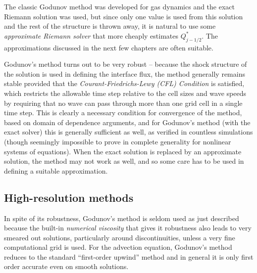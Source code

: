 \documentclass{SIAMbook2016}
\begin{document}
The classic Godunov method was developed for gas dynamics and the exact
Riemann solution was used, but since only one value is used from this
solution and the rest of the structure is thrown away, it is natural to
use some \emph{approximate Riemann solver} that more cheaply estimates
\(Q_{j-1/2}^*\). The approximations discussed in the next few chapters
are often suitable.

Godunov's method turns out to be very robust -- because the shock
structure of the solution is used in defining the interface flux, the
method generally remains stable provided that the
\emph{Courant-Friedrichs-Lewy (CFL) Condition} is satisfied, which
restricts the allowable time step relative to the cell sizes and wave
speeds by requiring that no wave can pass through more than one grid
cell in a single time step. This is clearly a necessary condition for
convergence of the method, based on domain of dependence arguments, and
for Godunov's method (with the exact solver) this is generally
sufficient as well, as verified in countless simulations (though
seemingly impossible to prove in complete generality for nonlinear
systems of equations). When the exact solution is replaced by an
approximate solution, the method may not work as well, and so some care
has to be used in defining a suitable approximation.

\hypertarget{high-resolution-methods}{%
\subsection{High-resolution methods}\label{high-resolution-methods}}

In spite of its robustness, Godunov's method is seldom used as just
described because the built-in \emph{numerical viscosity} that gives it
robustness also leads to very smeared out solutions, particularly around
discontinuities, unless a very fine computational grid is used. For the
advection equation, Godunov's method reduces to the standard
``first-order upwind'' method and in general it is only first order
accurate even on smooth solutions.
\end{document}
